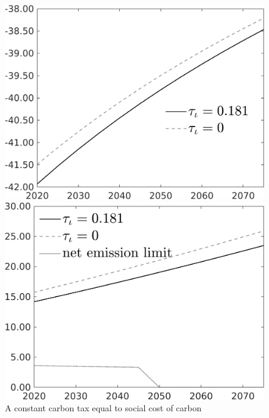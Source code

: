 \begin{figure}[h!!]
	\centering
	\caption{A constant carbon tax equal to social cost of carbon }\label{fig:Leveltauf_nsk0_xgr0_noknow_notaul}
	\begin{minipage}[]{0.32\textwidth}
	\includegraphics[width=1\textwidth]{../../codding_model/own_basedOnFried/optimalPol_010922_revision/figures/all_13Sept22/PerdifNoTauf_regime0_CompTaul_Emnet_spillover0_nsk0_xgr0_knspil0_sep0_LFlimit0_emsbase0_countec0_GovRev0_etaa0.79_lgd1.png}
\end{minipage}		
\begin{minipage}[]{0.4\textwidth}
	\includegraphics[width=1\textwidth]{../../codding_model/own_basedOnFried/optimalPol_010922_revision/figures/all_13Sept22/CompTauf_bytaul_Reg0_Emnet_spillover0_nsk0_xgr0_knspil0_sep0_LFlimit0_emsbase0_countec0_GovRev0_etaa0.79_lgd1.png}
\end{minipage}	
\end{figure} 
